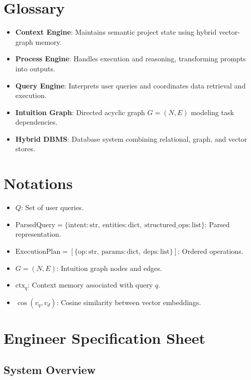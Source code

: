 \documentclass[11pt]{article}
\begin{document}
\appendix

\section{Glossary}
\label{app:glossary}

\begin{itemize}
    \item \textbf{Context Engine}: Maintains semantic project state using hybrid vector-graph memory.
    \item \textbf{Process Engine}: Handles execution and reasoning, transforming prompts into outputs.
    \item \textbf{Query Engine}: Interprets user queries and coordinates data retrieval and execution.
    \item \textbf{Intuition Graph}: Directed acyclic graph $G = (N, E)$ modeling task dependencies.
    \item \textbf{Hybrid DBMS}: Database system combining relational, graph, and vector stores.
\end{itemize}

\section{Notations}
\label{app:notations}

\begin{itemize}
    \item $Q$: Set of user queries.
    \item $\text{ParsedQuery} = \{ \text{intent}: \text{str},\ \text{entities}: \text{dict},\ \text{structured\_ops}: \text{list} \}$: Parsed representation.
    \item $\text{ExecutionPlan} = [ \{ \text{op}: \text{str},\ \text{params}: \text{dict},\ \text{deps}: \text{list} \} ]$: Ordered operations.
    \item $G = (N, E)$: Intuition graph nodes and edges.
    \item $\text{ctx}_q$: Context memory associated with query $q$.
    \item $\cos(v_q, v_d)$: Cosine similarity between vector embeddings.
\end{itemize}

\section{Engineer Specification Sheet}
\label{app:engineer_spec}

\subsection{System Overview}
\end{document}
